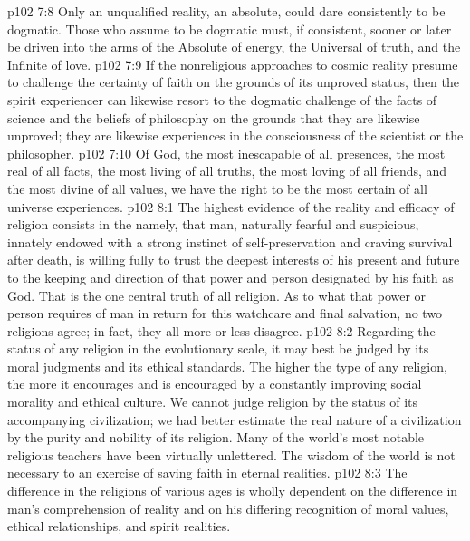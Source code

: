 \vs p102 7:8 Only an unqualified reality, an absolute, could dare consistently to be dogmatic. Those who assume to be dogmatic must, if consistent, sooner or later be driven into the arms of the Absolute of energy, the Universal of truth, and the Infinite of love.
\vs p102 7:9 If the nonreligious approaches to cosmic reality presume to challenge the certainty of faith on the grounds of its unproved status, then the spirit experiencer can likewise resort to the dogmatic challenge of the facts of science and the beliefs of philosophy on the grounds that they are likewise unproved; they are likewise experiences in the consciousness of the scientist or the philosopher.
\vs p102 7:10 \pc Of God, the most inescapable of all presences, the most real of all facts, the most living of all truths, the most loving of all friends, and the most divine of all values, we have the right to be the most certain of all universe experiences.
\vs p102 8:1 The highest evidence of the reality and efficacy of religion consists in the  namely, that man, naturally fearful and suspicious, innately endowed with a strong instinct of self\hyp{}preservation and craving survival after death, is willing fully to trust the deepest interests of his present and future to the keeping and direction of that power and person designated by his faith as God. That is the one central truth of all religion. As to what that power or person requires of man in return for this watchcare and final salvation, no two religions agree; in fact, they all more or less disagree.
\vs p102 8:2 Regarding the status of any religion in the evolutionary scale, it may best be judged by its moral judgments and its ethical standards. The higher the type of any religion, the more it encourages and is encouraged by a constantly improving social morality and ethical culture. We cannot judge religion by the status of its accompanying civilization; we had better estimate the real nature of a civilization by the purity and nobility of its religion. Many of the world’s most notable religious teachers have been virtually unlettered. The wisdom of the world is not necessary to an exercise of saving faith in eternal realities.
\vs p102 8:3 The difference in the religions of various ages is wholly dependent on the difference in man’s comprehension of reality and on his differing recognition of moral values, ethical relationships, and spirit realities.
